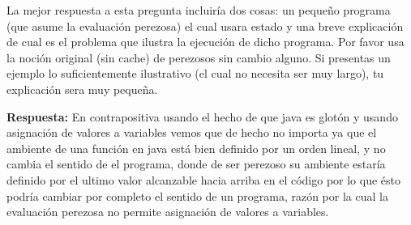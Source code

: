 \documentclass[12pt]{article}
\begin{document}
La mejor respuesta a esta pregunta incluiría dos cosas: un pequeño programa (que
asume la evaluación perezosa) el cual usara estado y una breve explicación de cual
es el problema que ilustra la ejecución de dicho programa. Por favor usa la
noción original (sin cache) de perezosos sin cambio alguno. Si presentas un
ejemplo lo suficientemente ilustrativo (el cual no necesita ser muy largo), tu
explicación sera muy pequeña.

\textbf{Respuesta: } En contrapositiva usando el hecho de que java es glotón y usando asignación de valores a variables vemos que de hecho no importa ya que el ambiente de una función en java está bien definido por un orden lineal, y no cambia el sentido de el programa, donde de ser perezoso su ambiente estaría definido por el ultimo valor alcanzable hacia arriba en el código por lo que ésto podría cambiar por completo el sentido de un programa, razón por la cual la evaluación perezosa no permite asignación de valores a variables.
\end{document}
